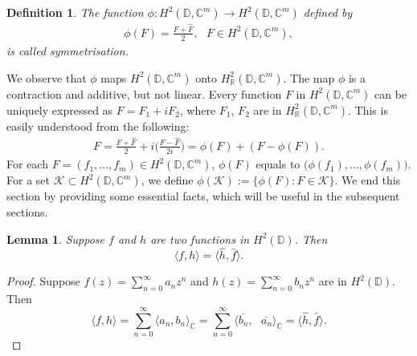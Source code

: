 \documentclass[11pt]{amsart}
\newtheorem{lemma}[theorem]{Lemma}
\newtheorem{definition}[theorem]{Definition}
\numberwithin{equation}{section}
\begin{document}
\begin{definition}
The function $\phi : H^2(\mathbb{D},\mathbb{C}^m) \longrightarrow H^2(\mathbb{D},\mathbb{C}^m)$ defined by 
\begin{eqnarray*}
    \phi(F)=\frac{F + \widehat{F}}{2}, \text{ } F\in H^2(\mathbb{D},\mathbb{C}^m), 
\end{eqnarray*} 
is called symmetrisation.
\end{definition}

We observe that $\phi$ maps $H^2(\mathbb{D},\mathbb{C}^m)$ onto $H^2_{\mathbb{R}}(\mathbb{D},\mathbb{C}^m)$. The map $\phi$ is a contraction and additive, but not linear. Every function $F$ in $H^2(\mathbb{D},\mathbb{C}^m)$ can be uniquely expressed as $F=F_1 + iF_2$, where $F_1$, $F_2$ are in  $H^2_{\mathbb{R}}(\mathbb{D},\mathbb{C}^m)$. This is easily understood from the following: 
\begin{eqnarray*}
    F=\frac{F + \widehat{F}}{2} + i\bigg(\frac{F - \widehat{F}}{2i}\bigg)=\phi(F) + (F - \phi(F)).
\end{eqnarray*}
For each $F=(f_1, \dots , f_m) \in H^2(\mathbb{D},\mathbb{C}^m)$, $\phi(F)$ equals to $\big(\phi(f_1), \dots , \phi(f_m)\big)$. For a set $\mathcal{K}\subset  H^2(\mathbb{D},\mathbb{C}^m)$, we define $\phi(\mathcal{K}):=\{\phi(F): F \in \mathcal{K}\}$.
We end this section by providing some essential facts, which will be useful in the subsequent sections.

\begin{lemma}\label{Lem1}
Suppose $f$ and $h$ are two functions in $H^2(\mathbb{D})$. Then $$\langle f, h \rangle = \langle \widehat{h}, \widehat{f} \rangle.$$   
\end{lemma}
\begin{proof}
Suppose $f(z)=\sum_{n=0}^{\infty}a_{n}z^n$ and $h(z)=\sum_{n=0}^{\infty}b_{n}z^n$ are in $H^2(\mathbb{D})$. Then $$\langle f, h \rangle =\sum_{n=0}^{\infty} \langle a_n, b_n \rangle_{\mathbb{C}}=\sum_{n=0}^{\infty}\langle\overline{b_n},\text{ }\overline{a_n}\rangle_{\mathbb{C}}=\langle \widehat{h}, \widehat{f} \rangle.$$
\end{proof}
\end{document}
